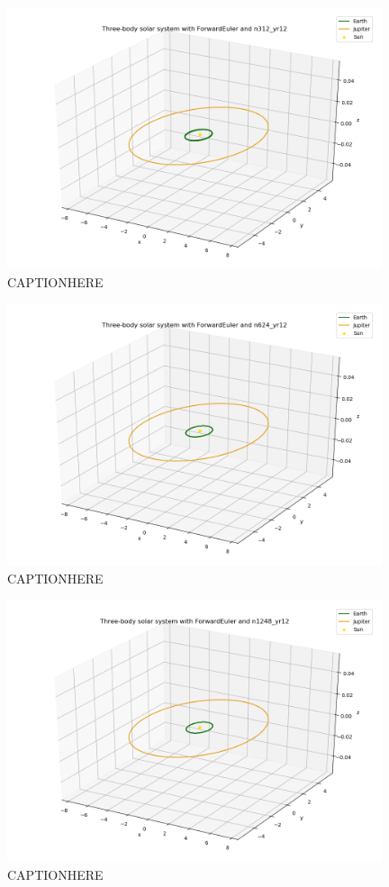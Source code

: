 \documentclass{article}
\begin{document}
    \begin{figure}[H]
        \centering
        \includegraphics[width = 11cm]{img/plot3D_S_E_J_F_n312_yr12.png}
        \caption{CAPTIONHERE}
        \label{fig:plot3D_S_E_J_F_n312_yr12}
    \end{figure}

    \begin{figure}[H]
        \centering
        \includegraphics[width = 11cm]{img/plot3D_S_E_J_F_n624_yr12.png}
        \caption{CAPTIONHERE}
        \label{fig:plot3D_S_E_J_F_624_yr12}
    \end{figure}

    \begin{figure}[H]
        \centering
        \includegraphics[width = 11cm]{img/plot3D_S_E_J_F_n1248_yr12.png}
        \caption{CAPTIONHERE}
        \label{fig:plot3D_S_E_J_F_n1248_yr12}
    \end{figure}
\end{document}
